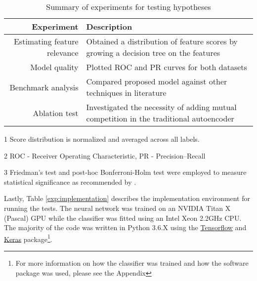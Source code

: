 \begin{table}[t]
  \centering
  \caption{Summary of experiments for testing hypotheses}
  \label{exp:key_results}
  \begin{threeparttable}
      \begin{tabular}{@{}rp{}@{}}
          \toprule
          Experiment                      & Description \\ \midrule
          Estimating feature relevance    & Obtained a distribution of feature scores by growing a decision tree on the features\tnote{1} \\
          Model quality         & Plotted ROC and PR curves for both
          datasets\tnote{2}\\
          Benchmark analysis     & Compared proposed model against other
          techniques in literature\tnote{3}\\
          Ablation test                   & Investigated the necessity of adding
          mutual competition in the traditional autoencoder\\\bottomrule
      \end{tabular}
  \begin{tablenotes}
      \footnotesize
      \item[1] Score distribution is normalized and averaged across all labels.
      \item[2] ROC - Receiver Operating Characteristic, PR - Precision--Recall
      \item[3] Friedman's test \parencite{friedman1937use} and post-hoc Bonferroni-Holm test \parencite{holm1979simple}
      were employed to measure statistical significance as recommended by \cite{demsar2006statistical}.
  \end{tablenotes}
  \end{threeparttable}
\end{table}

\par Lastly, Table \ref{exp:implementation} describes the implementation
environment for running the tests. The neural network was trained on an
NVIDIA Titan X (Pascal) GPU while the classifier was fitted using an Intel
Xeon 2.2GHz CPU. The majority of the code was written in Python 3.6.X using
the \href{https://www.tensorflow.org/}{Tensorflow} and
\href{https://keras.io/}{Keras} package\footnote{For more information on how
the classifier was trained and how the software package was used, please see
the Appendix}.

